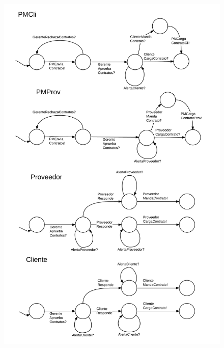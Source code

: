 \begin{figure}[H]
\includegraphics[width=\linewidth]{diag/nuevos/fsm-firmcont1.png}
\label{fsm-firmcont1}
\end{figure}

